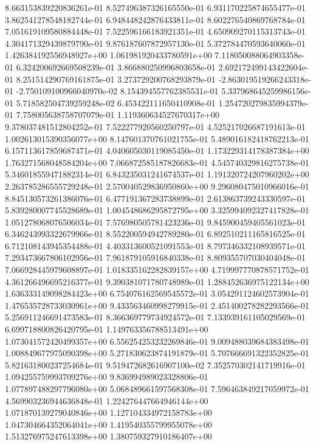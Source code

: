8.663153839220836261e-01
8.527496387326165550e-01
6.931170225874655477e-01
3.862541278548182744e-01
6.948448242876433811e-01
8.602276540869768784e-01
7.051619109580884448e-01
7.522596166183921351e-01
4.650909270115313743e-01
4.304171329439879790e-01
9.876187607872957130e-01
5.372784470593640060e-01
1.426384192556948927e+00
1.061981920433780591e+00
7.118050088064903358e-01
6.324200692669508239e-01
3.866880250996803658e-01
2.692172499143422604e-01
8.251514290769161875e-01
3.273729200768293879e-01
-2.863019519266243318e-01
-2.750109100966040970e-02
8.154394557762385531e-01
5.337968645259986156e-01
5.718582504739259248e-02
6.453422111650410908e-01
1.254720279835994379e-01
7.758005638758707079e-01
1.119360634527670317e+00
9.378037481512804252e-01
7.522277920560250797e-01
4.525217026687191613e-01
1.002613015390356077e+00
8.147601370761021755e-01
5.489016182418762213e-01
6.157113617859687471e-01
4.040605030119085450e-01
1.173229314178387384e+00
1.763271568048584204e+00
7.066872585187826683e-01
4.545740329816275738e-01
5.346018559471882314e-01
6.843235031241674537e-01
1.191320724207960202e+00
2.263785286555729248e-01
2.570040529836950860e+00
9.296080475010966016e-01
8.845130573261386076e-01
6.477191367283738899e-01
2.613863739243330597e-01
5.839280007745528689e-01
1.004548686295872795e+00
3.325994092327417828e-01
1.051278068076506034e-01
7.576980505781423236e-01
9.845900459405561023e-01
6.346243993322679966e-01
8.552200594942789280e-01
6.892510211165816525e-01
6.712108143945354488e-01
4.403313600521091553e-01
8.797346332108939571e-01
7.293473667806102956e-01
7.961879105916840338e-01
8.809355707030404048e-01
7.066928445979608897e-01
1.018335162282839157e+00
4.719997770878571752e-01
4.361266496695216377e-01
9.390381071780748989e-01
1.288452636975122134e+00
1.636333149098284423e+00
6.754076162569545572e-01
3.054291124602573904e-01
1.476535728733030961e+00
9.433563460998279915e-01
2.451400278282293566e-01
5.256911246691473583e-01
8.366369779734924572e-01
7.133939161105029569e-01
6.699718800826420795e-01
1.149763356788513491e+00
1.073041572420499357e+00
6.556254253232269846e-01
9.009488039684383498e-01
1.008849677975090398e+00
5.271830623874191879e-01
5.707666691322352825e-01
5.821631800237254684e-01
9.519472682616907100e-02
7.352570302141719916e-01
1.094255759993709276e+00
9.836994989023328806e-01
1.077897488297796080e+00
5.068489661597568308e-01
7.596463849217059972e-01
4.569903236944636848e-01
1.224276447664946144e+00
1.071870139279040846e+00
1.127104334972158783e+00
1.047304664352064041e+00
1.419540355799955078e+00
1.513276975247613398e+00
1.380759327910186407e+00
